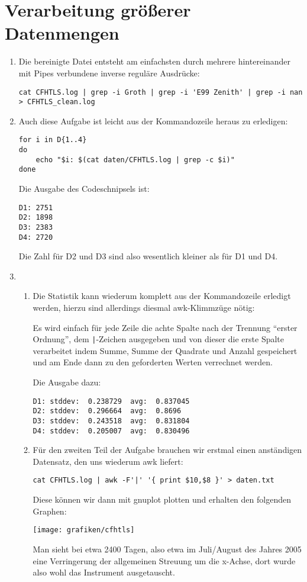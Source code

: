 \section{Verarbeitung größerer Datenmengen}

\begin{enumerate}
  \item Die bereinigte Datei entsteht am einfachsten durch mehrere
    hintereinander mit Pipes verbundene inverse reguläre Ausdrücke:
    \begin{lstlisting}
cat CFHTLS.log | grep -i Groth | grep -i 'E99 Zenith' | grep -i nan > CFHTLS_clean.log
    \end{lstlisting}
  \item Auch diese Aufgabe ist leicht aus der Kommandozeile heraus zu erledigen:
    \begin{lstlisting}
for i in D{1..4}
do
    echo "$i: $(cat daten/CFHTLS.log | grep -c $i)"
done
    \end{lstlisting}
    Die Ausgabe des Codeschnipsels ist:
    \begin{verbatim}
D1: 2751
D2: 1898
D3: 2383
D4: 2720
    \end{verbatim}
    Die Zahl für D2 und D3 sind also wesentlich kleiner als für D1 und D4.

  \item
    \begin{enumerate}
      \item Die Statistik kann wiederum komplett aus der Kommandozeile erledigt
        werden, hierzu sind allerdings diesmal awk-Klimmzüge nötig:
        
        Es wird einfach für jede Zeile die achte Spalte nach der Trennung
        "`erster Ordnung"', dem \verb'|'-Zeichen ausgegeben und von dieser die
        erste Spalte verarbeitet indem Summe, Summe der Quadrate und Anzahl
        gespeichert und am Ende dann zu den geforderten Werten verrechnet
        werden.

        Die Ausgabe dazu:
        \begin{verbatim}
D1: stddev:  0.238729  avg:  0.837045
D2: stddev:  0.296664  avg:  0.8696
D3: stddev:  0.243518  avg:  0.831804
D4: stddev:  0.205007  avg:  0.830496        
        \end{verbatim}
      \item Für den zweiten Teil der Aufgabe brauchen wir erstmal einen
        anständigen Datensatz, den uns wiederum awk liefert:
        \begin{lstlisting}
cat CFHTLS.log | awk -F'|' '{ print $10,$8 }' > daten.txt
        \end{lstlisting}
        Diese können wir dann mit gnuplot plotten und erhalten den folgenden
        Graphen:
          \begin{center}
            \texttt{[image: grafiken/cfhtls]}
          \end{center}
        Man sieht bei etwa 2400 Tagen, also etwa im Juli/August des Jahres 2005
        eine Verringerung der allgemeinen Streuung um die x-Achse, dort wurde also
        wohl das Instrument ausgetauscht.


\end{enumerate}
\end{enumerate}
